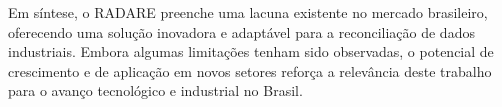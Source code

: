 Em síntese, o RADARE preenche uma lacuna existente no mercado brasileiro, oferecendo uma solução inovadora e adaptável para a reconciliação de dados industriais. Embora algumas limitações tenham sido observadas, o potencial de crescimento e de aplicação em novos setores reforça a relevância deste trabalho para o avanço tecnológico e industrial no Brasil.
